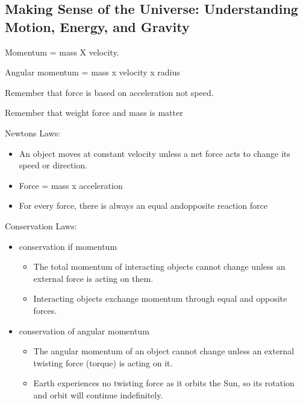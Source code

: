 \subsection{Making Sense of the Universe: Understanding Motion, Energy, and Gravity}
Momentum = mass X velocity.

Angular momentum = mass x velocity x radius

Remember that force is based on acceleration not speed.

Remember that weight force and mass is matter

Newtons Laws:
\begin{itemize}
\item An object moves at constant velocity unless a net force acts to change its speed or direction.
\item Force = mass x acceleration
\item For every force, there is always an equal andopposite reaction force
\end{itemize}

Conservation Laws:
\begin{itemize}
\item conservation if momentum
\begin{itemize}
\item The total momentum of interacting objects cannot change unless an external force is acting on them.
\item Interacting objects exchange momentum through equal and opposite forces.
\end{itemize}
\item conservation of angular momentum
\begin{itemize}
\item The angular momentum of an object cannot change unless an external twisting force (torque) is acting on it.
\item Earth experiences no twisting force as it orbits the Sun, so its rotation and orbit will continue indefinitely.
\end{itemize}
\end{itemize}

